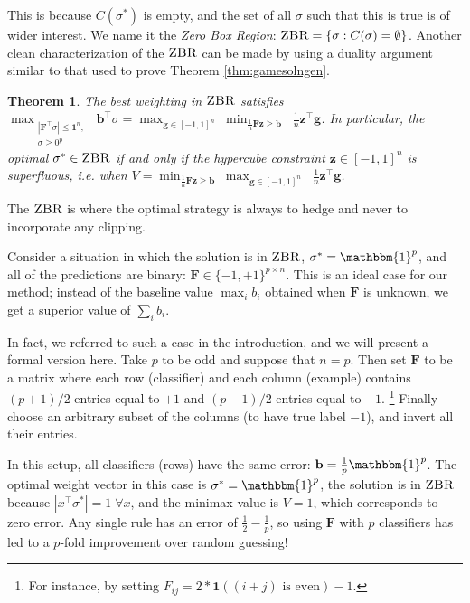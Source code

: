 \documentclass{colt2015} %
\newtheorem{thm}{Theorem}%
\newcommand{\ones}[1]{\mathbbm{1}^{#1}}
\newcommand{\vF}{\mathbf{F}}
\newcommand{\vb}{\mathbf{b}}
\newcommand{\vg}{\mathbf{g}}
\newcommand{\vz}{\mathbf{z}}
\newcommand{\ifn}{\mathbf{1}} %
\newcommand{\abs}[1]{\left| #1 \right|}
\newcommand{\zbr}{\textsc{ZBR}}
\newcommand{\authcmt}[2]{\textcolor{#1}{}}
\newcommand{\yoav}[1]{\authcmt{blue}{[YF: #1]}}
\begin{document}
This is because $C(\sigma^*)$ is empty, 
and the set of all $\sigma$ such that this is true is of wider interest. 
We name it the \emph{Zero Box Region}: $\zbr = \left\{ \sigma : C(\sigma) = \emptyset \right\}$.
Another clean characterization of the $\zbr$ can be made by using a 
duality argument similar to that used to prove Theorem \ref{thm:gamesolngen}. 

\begin{thm}
\label{thm:zbrunconstr}
The best weighting in $\zbr$ satisfies 
$\displaystyle \max_{\substack{ \abs{\vF^\top \sigma} \leq \mathbf{1}^n , \\ \sigma \geq 0^p }} \; \vb^\top \sigma 
= \max_{\vg \in [-1,1]^n} \;\min_{\frac{1}{n} \vF \vz \geq \vb } \;\; \frac{1}{n} \vz^\top \vg  $\;. 
In particular, the optimal $\sigma^* \in \zbr$ if and only if 
the hypercube constraint $\vz \in [-1,1]^{n}$ is superfluous, i.e. when 
$\displaystyle V = \min_{ \frac{1}{n} \vF \vz \geq \vb } \;\max_{\vg \in [-1,1]^n} \;\; \frac{1}{n} \vz^\top \vg $\;.
\end{thm}
The $\zbr$ is where the optimal strategy is always to hedge 
and never to incorporate any clipping. 

Consider a situation in which the solution is in $\zbr$, $\sigma^*=\ones{p}$, 
and all of the predictions are binary: $\vF \in \{-1,+1\}^{p \times n}$.
This is an ideal case for our method; instead of the baseline value $\max_i b_i$
obtained when $\vF$ is unknown, we get a superior value of $\sum_i b_i$. 

In fact, we referred to such a case in the introduction, 
and we will present a formal version here. 
Take $p$ to be odd and suppose that $n=p$. 
Then set $\vF$ to be a matrix where each row (classifier) and each column (example)
contains $(p+1)/2$ entries equal to $+1$ and $(p-1)/2$ entries equal to $-1$.
\footnote{For instance, by setting $F_{ij} = 2 * \ifn((i+j) \text{ is even}) - 1$.} 
Finally choose an arbitrary subset of the columns (to have true label $-1$), 
and invert all their entries. 

In this setup, all classifiers (rows) have the same error: $\vb= \frac{1}{p} \ones{p}$. 
The optimal weight vector in this case is $\sigma^*=\ones{p}$, 
the solution is in $\zbr$ because $\abs{x^\top \sigma^*} = 1 \;\forall x$, and the minimax value is $V=1$, 
which corresponds to zero error. 
Any single rule has an error of $\frac{1}{2} - \frac{1}{p}$, 
so using $\vF$ with $p$ classifiers has led to a $p$-fold improvement over random guessing!
\end{document}
